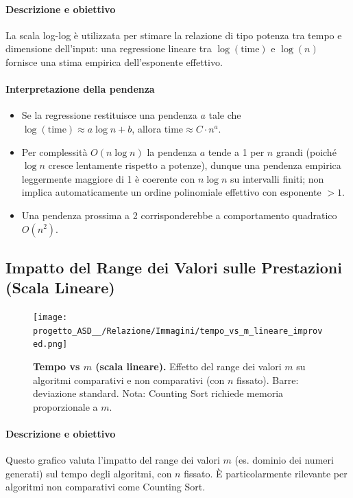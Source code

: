 \documentclass[a4paper, 11pt]{article}
\begin{document}
\paragraph{Descrizione e obiettivo}
La scala log-log è utilizzata per stimare la relazione di tipo potenza tra tempo e dimensione dell'input: una regressione lineare tra \(\log(\text{time})\) e \(\log(n)\) fornisce una stima empirica dell'esponente effettivo.

\paragraph{Interpretazione della pendenza}
\begin{itemize}
  \item Se la regressione restituisce una pendenza \(a\) tale che \(\log(\text{time}) \approx a\log n + b\), allora \(\text{time} \approx C\cdot n^{a}\).
  \item Per complessità \(O(n\log n)\) la pendenza \(a\) tende a 1 per \(n\) grandi (poiché \(\log n\) cresce lentamente rispetto a potenze), dunque una pendenza empirica leggermente maggiore di 1 è coerente con \(n\log n\) su intervalli finiti; non implica automaticamente un ordine polinomiale effettivo con esponente \(>1\).
  \item Una pendenza prossima a 2 corrisponderebbe a comportamento quadratico \(O(n^2)\).
\end{itemize}

\subsection{Impatto del Range dei Valori sulle Prestazioni (Scala Lineare)}
\begin{figure}[H]
\centering
\texttt{[image: progetto\_ASD\_\_/Relazione/Immagini/tempo\_vs\_m\_lineare\_improved.png]}
\caption{\textbf{Tempo vs \(m\) (scala lineare).} Effetto del range dei valori \(m\) su algoritmi comparativi e non comparativi (con \(n\) fissato). Barre: deviazione standard. Nota: Counting Sort richiede memoria proporzionale a \(m\).}
\label{fig:variazione_m}
\end{figure}

\paragraph{Descrizione e obiettivo}
Questo grafico valuta l'impatto del range dei valori \(m\) (es. dominio dei numeri generati) sul tempo degli algoritmi, con \(n\) fissato. È particolarmente rilevante per algoritmi non comparativi come Counting Sort.
\end{document}
